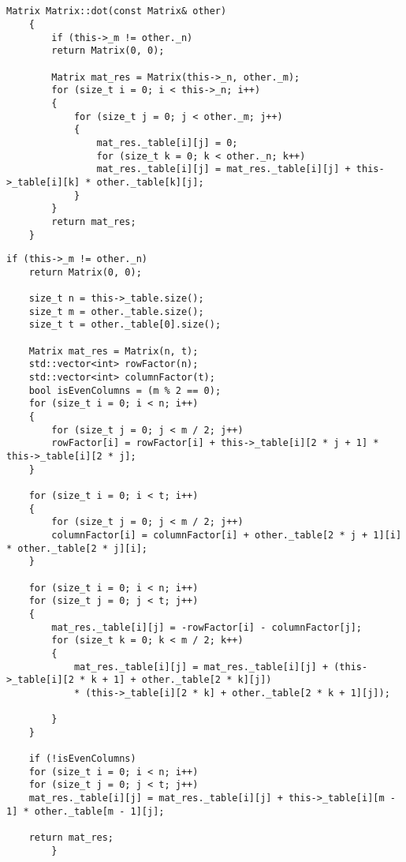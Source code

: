 \begin{appendices}
	\chapter{}
	\begin{lstlisting}[label=lst:std,caption=Реализация стандартного алгоритма расчета произведения матриц]
	Matrix Matrix::dot(const Matrix& other)
	{
		if (this->_m != other._n)
		return Matrix(0, 0);
		
		Matrix mat_res = Matrix(this->_n, other._m);
		for (size_t i = 0; i < this->_n; i++)
		{
			for (size_t j = 0; j < other._m; j++)
			{
				mat_res._table[i][j] = 0;
				for (size_t k = 0; k < other._n; k++)
				mat_res._table[i][j] = mat_res._table[i][j] + this->_table[i][k] * other._table[k][j];
			}
		}
		return mat_res;
	}
	\end{lstlisting}
	
	
	
	\begin{lstlisting}[label=lst:vin,caption=Реализация алгоритма расчета произведения матриц Винограда]
	if (this->_m != other._n)
	return Matrix(0, 0);
	
	size_t n = this->_table.size();
	size_t m = other._table.size();
	size_t t = other._table[0].size();
	
	Matrix mat_res = Matrix(n, t);
	std::vector<int> rowFactor(n);
	std::vector<int> columnFactor(t);
	bool isEvenColumns = (m % 2 == 0);
	for (size_t i = 0; i < n; i++)
	{
		for (size_t j = 0; j < m / 2; j++)
		rowFactor[i] = rowFactor[i] + this->_table[i][2 * j + 1] * this->_table[i][2 * j];
	}
	
	for (size_t i = 0; i < t; i++)
	{
		for (size_t j = 0; j < m / 2; j++)
		columnFactor[i] = columnFactor[i] + other._table[2 * j + 1][i] * other._table[2 * j][i];
	}
	
	for (size_t i = 0; i < n; i++)
	for (size_t j = 0; j < t; j++)
	{
		mat_res._table[i][j] = -rowFactor[i] - columnFactor[j];
		for (size_t k = 0; k < m / 2; k++)
		{
			mat_res._table[i][j] = mat_res._table[i][j] + (this->_table[i][2 * k + 1] + other._table[2 * k][j])
			* (this->_table[i][2 * k] + other._table[2 * k + 1][j]);
			
		}
	}
	
	if (!isEvenColumns)
	for (size_t i = 0; i < n; i++)
	for (size_t j = 0; j < t; j++)
	mat_res._table[i][j] = mat_res._table[i][j] + this->_table[i][m - 1] * other._table[m - 1][j];
	
	return mat_res;
		}
	\end{lstlisting}
	

\end{appendices}
